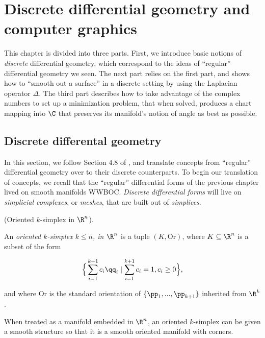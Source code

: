 \chapter{Discrete differential geometry and computer graphics}
\label{ch::ddg}

This chapter is divided into three parts. First, we introduce basic notions of \textit{discrete} differential geometry, which correspond to the ideas of ``regular'' differential geometry we seen. The next part relies on the first part, and shows how to ``smooth out a surface'' in a discrete setting by using the Laplacian operator $\Delta$. The third part describes how to take advantage of the complex numbers to set up a minimization problem, that when solved, produces a chart mapping into $\C$ that preserves its manifold's notion of angle as best as possible.

\section{Discrete differental geometry}

In this section, we follow Section 4.8 of \cite{book::DDG}, and translate concepts from ``regular'' differential geometry over to their discrete counterparts. To begin our translation of concepts, we recall that the ``regular'' differential forms of the previous chapter lived on smooth manifolds WWBOC. \textit{Discrete differential forms} will live on \textit{simplicial complexes}, or \textit{meshes}, that are built out of \textit{simplices}.

\begin{defn}
    (Oriented $k$-simplex in $\R^n$).
    
    An \textit{oriented $k$-simplex $k \leq n$, in $\R^n$} is a tuple $(K, \text{Or})$, where $K \subseteq \R^n$ is a subset of the form
    
    \begin{align*}
        \Big\{ \sum_{i = 1}^{k + 1} c_i \qq_i \mid \sum_{i = 1}^{k +1} c_i = 1, c_i \geq 0 \Big\},
    \end{align*}
    
    and where $\text{Or}$ is the standard orientation of $\{\pp_1, ..., \pp_{k + 1} \}$ inherited from $\R^k$.
    
    When treated as a manifold embedded in $\R^n$, an oriented $k$-simplex can be given a smooth structure so that it is a smooth oriented manifold with corners.
\end{defn}

